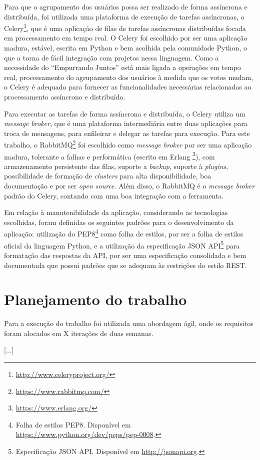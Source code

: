     Para que o agrupamento dos usuários possa ser realizado de forma assíncrona e distribuída, 
    foi utilizada uma plataforma de execução de tarefas assíncronas,
    o Celery\footnote{\href{http://www.celeryproject.org/}{http://www.celeryproject.org/}},
    que é uma aplicação de filas de tarefas assíncronas distribuídas focada em processamento em tempo real.
    O Celery foi escolhido por ser uma aplicação madura, estável, escrita em Python e bem acolhida pela comunidade Python,
    o que a torna de fácil integração com projetos nessa linguagem.
    Como a necessidade do ``Empurrando Juntos'' está mais ligada a operações em tempo real,
    processamento do agrupamento dos usuários à medida que os votos mudam,
    o Celery é adequado para fornecer as funcionalidades necessárias relacionadas ao processamento assíncrono e distribuído.
    
    Para executar as tarefas de forma assíncrona e distribuída, o Celery utiliza um \textit{message broker},
    que é uma plataforma intermediária entre duas aplicações para troca de mensagens,
    para enfileirar e delegar as tarefas para execução. 
    Para este trabalho, o RabbitMQ\footnote{\href{https://www.rabbitmq.com/}{https://www.rabbitmq.com/}}
    foi escolhido como \textit{message broker} por ser uma aplicação madura, tolerante a falhas e performática
    (escrito em Erlang \footnote{\href{https://www.erlang.org/}{https://www.erlang.org/}}),
    com armazenamento persistente das filas, suporte a \textit{backup}, suporte à \textit{plugins},
    possibilidade de formação de \textit{clusters} para alta disponibilidade,
    boa documentação e por ser \textit{open source}.
    Além disso, o RabbitMQ é o \textit{message broker} padrão do Celery, contando com uma boa integração com a ferramenta.
    
    Em relação à manutenibilidade da aplicação, considerando as tecnologias escolhidas,
    foram definidas os seguintes padrões para o desenvolvimento da aplicação:
    utilização do PEP8\footnote{Folha de estilos PEP8. Disponível em \href{https://www.python.org/dev/peps/pep-0008/}{https://www.python.org/dev/peps/pep-0008}.}
    como folha de estilos, por ser a folha de estilos oficial da linguagem Python,
    e a utilização da especificação JSON API\footnote{Especificação JSON API. Disponível em \href{http://jsonapi.org/}{http://jsonapi.org}.}
    para formatação das respostas da API, por ser uma especificação consolidada e bem documentada que possui padrões que
    se adequam às restrições do estilo REST.
    
\section{Planejamento do trabalho}

    Para a execução do trabalho foi utilizada uma abordagem ágil, onde os requisitos foram alocados em X iterações de duas semanas.
    
    [...]